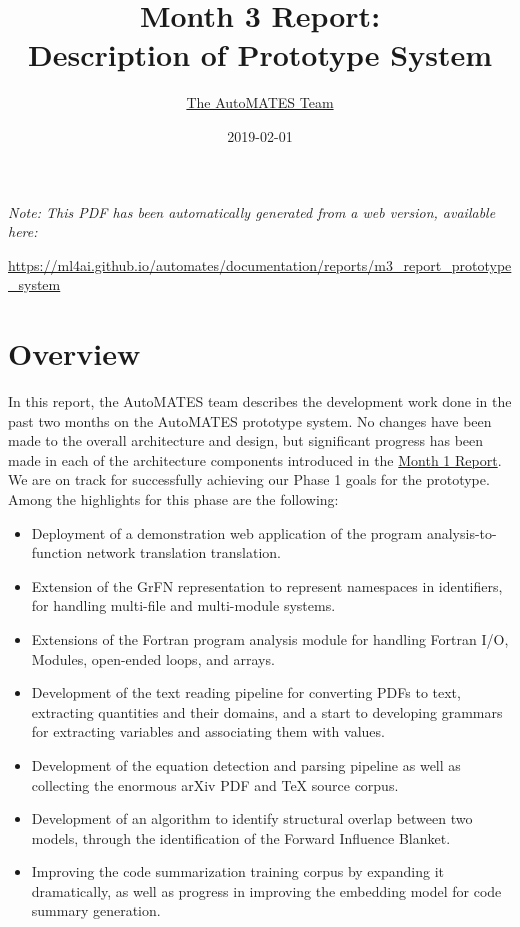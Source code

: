 \documentclass[article, 12pt, oneside]{memoir}
\title{Month 3 Report:\\Description of Prototype System}
\author{\href{https://ml4ai.github.io/automates/team/}{The AutoMATES Team}}
\date{2019-02-01}
\begin{document}
\maketitle
\tableofcontents*

\bigskip
\bigskip

\noindent \emph{Note: This PDF has been automatically generated from a web
  version, available here:}

  {
  \small
\noindent \url{https://ml4ai.github.io/automates/documentation/reports/m3_report_prototype_system}
}

\hypertarget{overview}{%
\section{Overview}\label{overview}}

In this report, the AutoMATES team describes the development work done
in the past two months on the AutoMATES prototype system. No changes
have been made to the overall architecture and design, but significant
progress has been made in each of the architecture components introduced
in the
\href{https://ml4ai.github.io/automates/documentation/reports/m1_architecture_report/}{Month
1 Report}. We are on track for successfully achieving our Phase 1 goals
for the prototype. Among the highlights for this phase are the
following: 

\begin{itemize}
\tightlist
\item
  Deployment of a demonstration web application of the program
  analysis-to-function network translation translation.
\item
  Extension of the GrFN representation to represent namespaces in
  identifiers, for handling multi-file and multi-module systems.
\item
  Extensions of the Fortran program analysis module for handling Fortran
  I/O, Modules, open-ended loops, and arrays.
\item
  Development of the text reading pipeline for converting PDFs to text,
  extracting quantities and their domains, and a start to developing
  grammars for extracting variables and associating them with values.
\item
  Development of the equation detection and parsing pipeline as well as
  collecting the enormous arXiv PDF and TeX source corpus.
\item
  Development of an algorithm to identify structural overlap between two
  models, through the identification of the Forward Influence Blanket.
\item
  Improving the code summarization training corpus by expanding it
  dramatically, as well as progress in improving the embedding model for
  code summary generation.
\end{itemize}
\end{document}
